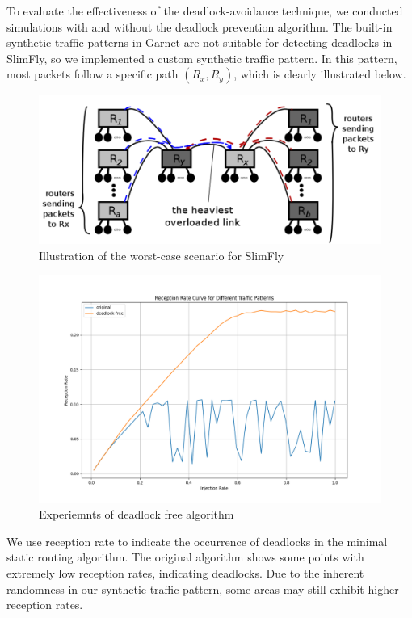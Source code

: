 \documentclass[utf8]{article}
\begin{document}
To evaluate the effectiveness of the deadlock-avoidance technique, we conducted simulations with and without the deadlock prevention algorithm. The built-in synthetic traffic patterns in Garnet are not suitable for detecting deadlocks in SlimFly, so we implemented a custom synthetic traffic pattern. In this pattern, most packets follow a specific path \((R_x, R_y)\), which is clearly illustrated below.

\begin{figure}[H]
    \centering
    \includegraphics[width=0.6\linewidth]{WorstCase.png}
    \caption{Illustration of the worst-case scenario for SlimFly}
\end{figure}

\begin{figure}[H]
    \centering
    \includegraphics[width=0.85\linewidth]{deadlock.png}
    \caption{Experiemnts of deadlock free algorithm}
\end{figure}

We use reception rate to indicate the occurrence of deadlocks in the minimal static routing algorithm. The original algorithm shows some points with extremely low reception rates, indicating deadlocks. Due to the inherent randomness in our synthetic traffic pattern, some areas may still exhibit higher reception rates.
\end{document}
